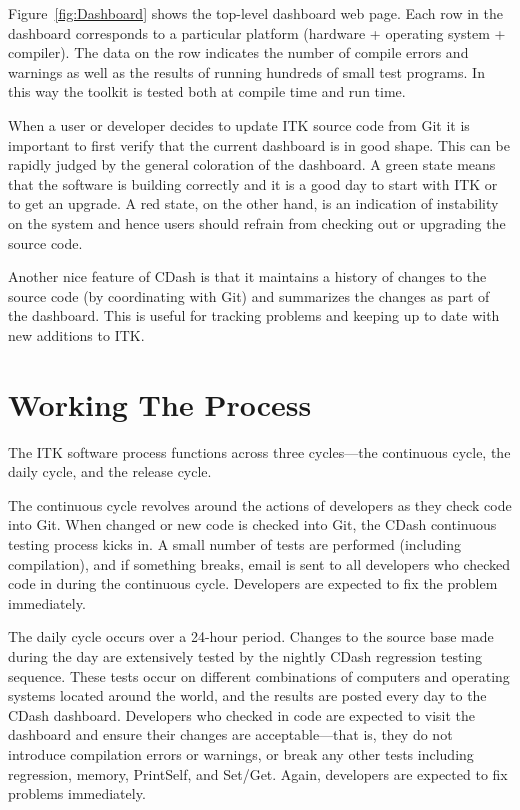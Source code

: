 Figure~\ref{fig:Dashboard} shows the top-level dashboard web page. Each row
in the dashboard corresponds to a particular platform (hardware + operating
system + compiler). The data on the row indicates the number of compile
errors and warnings as well as the results of running hundreds of
small test programs. In this way the toolkit is tested both at compile time
and run time.

When a user or developer decides to update ITK source code from Git it is
important to first verify that the current dashboard is in good shape. This
can be rapidly judged by the general coloration of the dashboard. A green
state means that the software is building correctly and it is a good day to
start with ITK or to get an upgrade. A red state, on the other hand, is an
indication of instability on the system and hence users should refrain from
checking out or upgrading the source code.

Another nice feature of CDash is that it maintains a history of changes to the
source code (by coordinating with Git) and summarizes the changes as part of
the dashboard. This is useful for tracking problems and keeping up to date
with new additions to ITK.

\section{Working The Process}
\label{sec:WorkingTheProcess}

The ITK software process functions across three cycles---the continuous
cycle, the daily cycle, and the release cycle.

The continuous cycle revolves around the actions of developers as they check
code into Git. When changed or new code is checked into Git, the CDash
continuous testing process kicks in. A small number of tests are performed
(including compilation), and if something breaks, email is sent to all
developers who checked code in during the continuous cycle. Developers are
expected to fix the problem immediately.

The daily cycle occurs over a 24-hour period. Changes to the source base made
during the day are extensively tested by the nightly CDash regression testing
sequence. These tests occur on different combinations of computers and
operating systems located around the world, and the results are posted every
day to the CDash dashboard. Developers who checked in code are expected to
visit the dashboard and ensure their changes are acceptable---that is, they
do not introduce compilation errors or warnings, or break any other tests
including regression, memory, PrintSelf, and Set/Get. Again, developers are
expected to fix problems immediately.

